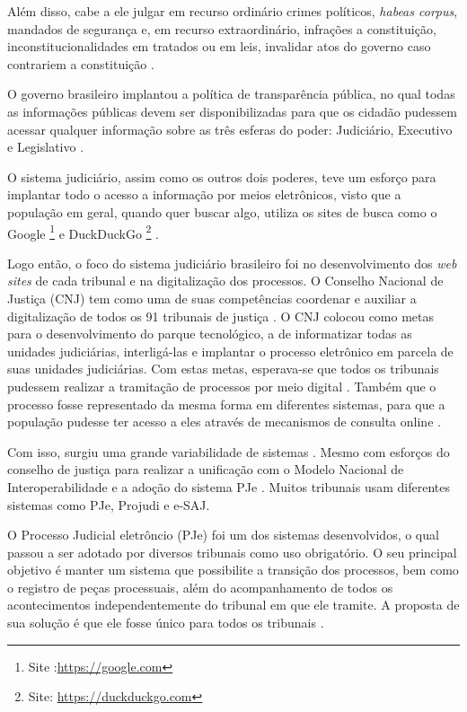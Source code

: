 Além disso, cabe a ele julgar em recurso ordinário crimes políticos, \textit{habeas corpus}, mandados de segurança e, em recurso extraordinário, infrações a constituição, inconstitucionalidades em tratados ou em leis, invalidar atos do governo caso contrariem a constituição \cite{BRASIL1988}.

O governo brasileiro implantou a política de transparência pública, no qual todas as informações públicas devem ser disponibilizadas para que os cidadão pudessem acessar qualquer informação sobre as três esferas do poder: Judiciário, Executivo e Legislativo \cite{CONGRESSO2011}.

O sistema judiciário, assim como os outros dois poderes, teve um esforço para implantar todo o acesso a informação por meios eletrônicos, visto que a população em geral, quando quer buscar algo, utiliza os sites de busca como o Google \footnote{Site :\url{https://google.com}} e DuckDuckGo \footnote{Site: \url{https://duckduckgo.com}} \cite{RUSCHEL2011}.

Logo então, o foco do sistema judiciário brasileiro foi no desenvolvimento dos \textit{web sites} de cada tribunal e na digitalização dos processos. O Conselho Nacional de Justiça (CNJ) tem como uma de suas competências coordenar e auxiliar a digitalização de todos os 91 tribunais de justiça \cite{RUSCHEL2011}. O CNJ colocou como metas para o desenvolvimento do parque tecnológico, a de informatizar todas as unidades judiciárias, interligá-las e implantar  o  processo  eletrônico  em  parcela  de  suas unidades judiciárias. %
Com estas metas, esperava-se que todos os tribunais pudessem realizar a tramitação de processos por meio digital \cite{CNJ2009}. Também que o processo fosse representado da mesma forma em diferentes sistemas, para que a população pudesse ter acesso a eles através de mecanismos de consulta online \cite{RUSCHEL2011}.

Com isso, surgiu uma grande variabilidade de sistemas%
. Mesmo com esforços do conselho de justiça para realizar a unificação com o Modelo Nacional de Interoperabilidade \cite{CNJ2009} e a adoção do sistema PJe%
. Muitos tribunais usam diferentes sistemas como PJe, Projudi e e-SAJ.

O Processo Judicial eletrôncio (PJe) foi um dos sistemas desenvolvidos, o qual passou a ser adotado por diversos tribunais como uso obrigatório. O seu principal objetivo é manter um sistema que possibilite a transição dos processos, bem como o registro de peças processuais, além do acompanhamento de todos os acontecimentos independentemente do tribunal em que ele tramite. A proposta de sua solução é que ele fosse único para todos os tribunais \cite{PJe2018}.

